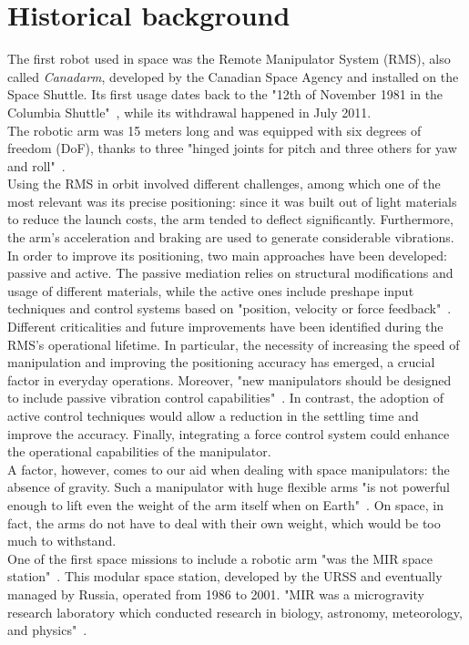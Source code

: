 \documentclass[a4paper,12pt,oneside]{report}
\begin{document}
\section{Historical background}
The first robot used in space was the Remote Manipulator System (RMS), also called \textit{Canadarm}, developed by the Canadian Space Agency and installed on the Space Shuttle. Its first usage dates back to the "12th of November 1981 in the Columbia Shuttle"~\cite{five}, while its withdrawal happened in July 2011.\\
The robotic arm was 15 meters long and was equipped with six degrees of freedom (DoF), thanks to three "hinged joints for pitch and three others for yaw and roll"~\cite{five}.\\
Using the RMS in orbit involved different challenges, among which one of the most relevant was its precise positioning: since it was built out of light materials to reduce the launch costs, the arm tended to deflect significantly. Furthermore, the arm's acceleration and braking are used to generate considerable vibrations. In order to improve its positioning, two main approaches have been developed: passive and active. The passive mediation relies on structural modifications and usage of different materials, while the active ones include preshape input techniques and control systems based on "position, velocity or force feedback"~\cite{five}.\\
Different criticalities and future improvements have been identified during the RMS's operational lifetime. In particular, the necessity of increasing the speed of manipulation and improving the positioning accuracy has emerged, a crucial factor in everyday operations. Moreover, "new manipulators should be designed to include passive vibration control capabilities"~\cite{five}. In contrast, the adoption of active control techniques would allow a reduction in the settling time and improve the accuracy. Finally, integrating a force control system could enhance the operational capabilities of the manipulator.\\
A factor, however, comes to our aid when dealing with space manipulators: the absence of gravity. Such a manipulator with huge flexible arms "is not powerful enough to lift even the weight of the arm itself when on Earth"~\cite{six}. On space, in fact, the arms do not have to deal with their own weight, which would be too much to withstand.\\
One of the first space missions to include a robotic arm "was the MIR space station"~\cite{six}. This modular space station, developed by the URSS and eventually managed by Russia, operated from 1986 to 2001. "MIR was a microgravity research laboratory which conducted research in biology, astronomy, meteorology, and physics"~\cite{six}.\\
\end{document}
